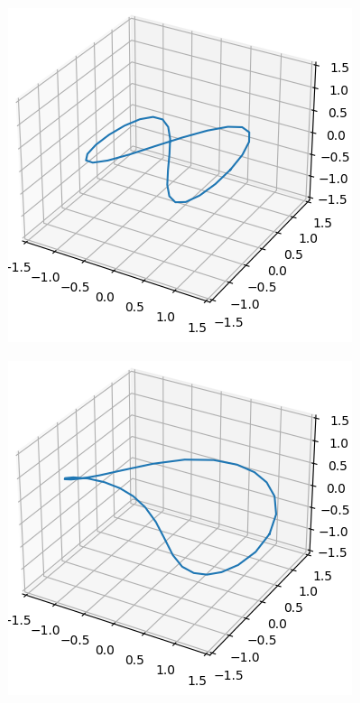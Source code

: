 \documentclass[../dissertation.tex]{subfiles}
\begin{document}
\begin{figure}[tbp]
    \centering
    \begin{subfigure}[b]{0.32\textwidth}
        \centering
        \includegraphics[width=\textwidth]{sections/unknottingCurveImgs/figure8-H1-0}
    \end{subfigure}
    \begin{subfigure}[b]{0.32\textwidth}
        \centering
        \includegraphics[width=\textwidth]{sections/unknottingCurveImgs/figure8-H1-1}

\end{subfigure}
\end{figure}
\end{document}
